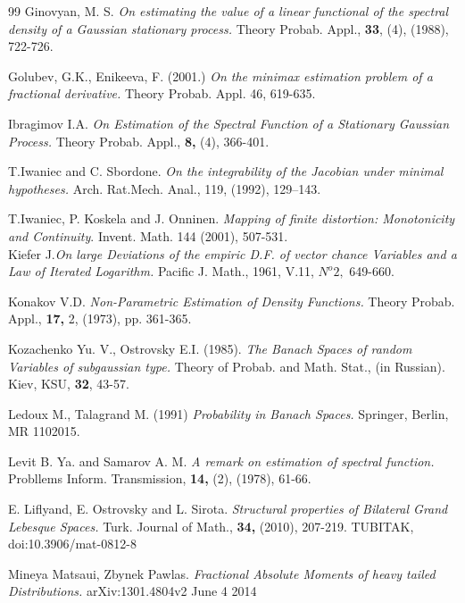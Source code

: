 \begin{thebibliography}{99}
{\sc Ginovyan, M. S.} {\it On estimating the value of a linear functional of the spectral density of a
Gaussian stationary process. } Theory Probab. Appl.,  {\bf 33}, (4), (1988),  722-726.

{\sc Golubev, G.K., Enikeeva, F.} (2001.) {\it On the minimax estimation problem of a fractional derivative.}
 Theory Probab. Appl. 46, 619-635.

{\sc Ibragimov I.A.} {\it On Estimation of the Spectral Function of a Stationary Gaussian Process.}
Theory Probab. Appl., {\bf 8,} (4), 366-401.

{\sc T.Iwaniec and C. Sbordone.} {\it On the integrability of the Jacobian under minimal hypotheses.}
Arch. Rat.Mech. Anal., 119, (1992), 129–143.

{\sc T.Iwaniec, P. Koskela and J. Onninen.} {\it Mapping of finite distortion:
Monotonicity and Continuity}. Invent. Math. 144 (2001), 507-531.\\

{\sc Kiefer J.}{\it On large Deviations of the empiric D.F. of vector chance Variables and a Law of Iterated
Logarithm.} Pacific J. Math., 1961, V.11,  $  N^o 2,$ 649-660.

{\sc Konakov V.D.} {\it Non-Parametric Estimation of Density Functions.}
Theory Probab. Appl., {\bf 17,} 2, (1973), pp. 361-365.

 {\sc Kozachenko Yu. V., Ostrovsky E.I.} (1985). {\it The Banach Spaces of
      random Variables of subgaussian type. }  Theory of Probab. and Math.
      Stat., (in Russian). Kiev, KSU, {\bf 32}, 43-57.

 {\sc Ledoux M., Talagrand M.} (1991) {\it Probability in Banach Spaces.}
      Springer, Berlin, MR 1102015.

{\sc Levit B. Ya. and Samarov A. M.} {\it A remark on estimation of spectral function.} Probllems
Inform. Transmission, {\bf 14,} (2), (1978), 61-66.

{\sc E. Liflyand, E. Ostrovsky and L. Sirota.} {\it Structural properties of Bilateral Grand Lebesque Spaces.}
Turk. Journal of Math., {\bf 34,} (2010), 207-219.
TUBITAK, doi:10.3906/mat-0812-8

{\sc  Mineya Matsaui, Zbynek Pawlas.  } {\it  Fractional Absolute Moments of heavy tailed Distributions. }
arXiv:1301.4804v2 June 4 2014


\end{thebibliography}
